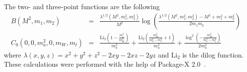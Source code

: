 \documentclass[prd,amsfonts,onecolumn,superscriptaddress,aps,nofootinbib,11pt]{revtex4-1}
\begin{document}
 The two- and three-point functions are the following
 \begin{eqnarray*}
     B(M^2,m_1,m_2) &=& \frac{\lambda ^{1/2}\left(M^2,m_1^2,m_2^2\right)}{M^2} \log
   \left(\frac{\lambda
   ^{1/2}\left(M^2,m_1^2,m_2^2\right)-M^2+m_1^2+m_2^
   2}{2 m_1 m_2}\right) \\
   C_0(0, 0, m_a^2, 0, m_W, m_t) &=& \frac{\text{Li}_2\left(1-\frac{m_t^2}{m_W^2}\right)}{m_a^2
   }+\frac{\text{Li}_2\left(\frac{m_W^2}{m_a^2-m_t^2}+1\right)}{m_a^2}+\frac{\log
   ^2\left(-\frac{m_W^2}{m_a^2-m_t^2}\right)}{2
   m_a^2}
 \end{eqnarray*}
 where $\lambda(x,y,z)=x^2+y^2+z^2-2xy-2xz-2yz$ and $\text{Li}_2$ is the dilog function. These calculations were performed with the help of Package-X 2.0~\cite{Patel:2016fam}.



 
\end{document}
